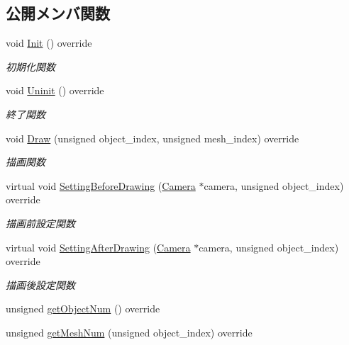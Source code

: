 \subsection*{公開メンバ関数}
\begin{DoxyCompactItemize}
\item 
void \mbox{\hyperlink{class_stencil_shadow_test_draw_a65be72e71cd12cacf315b0364c12c3e3}{Init}} () override
\begin{DoxyCompactList}\small\item\em 初期化関数 \end{DoxyCompactList}\item 
void \mbox{\hyperlink{class_stencil_shadow_test_draw_ad0672bf4ecfc8091cf54ed6f2c76b618}{Uninit}} () override
\begin{DoxyCompactList}\small\item\em 終了関数 \end{DoxyCompactList}\item 
void \mbox{\hyperlink{class_stencil_shadow_test_draw_abb5f9445b7d94c213a3751fa57e36643}{Draw}} (unsigned object\+\_\+index, unsigned mesh\+\_\+index) override
\begin{DoxyCompactList}\small\item\em 描画関数 \end{DoxyCompactList}\item 
virtual void \mbox{\hyperlink{class_stencil_shadow_test_draw_a0f697b6dad67048c7f8916a53cca6b1c}{Setting\+Before\+Drawing}} (\mbox{\hyperlink{class_camera}{Camera}} $\ast$camera, unsigned object\+\_\+index) override
\begin{DoxyCompactList}\small\item\em 描画前設定関数 \end{DoxyCompactList}\item 
virtual void \mbox{\hyperlink{class_stencil_shadow_test_draw_a68917115d3f151ed91ce297924ee5bbb}{Setting\+After\+Drawing}} (\mbox{\hyperlink{class_camera}{Camera}} $\ast$camera, unsigned object\+\_\+index) override
\begin{DoxyCompactList}\small\item\em 描画後設定関数 \end{DoxyCompactList}\item 
unsigned \mbox{\hyperlink{class_stencil_shadow_test_draw_ad93f1c8a60a701d185108896c58dd578}{get\+Object\+Num}} () override
\item 
unsigned \mbox{\hyperlink{class_stencil_shadow_test_draw_a285b3045ff5cc34b6b2b991cca434bb3}{get\+Mesh\+Num}} (unsigned object\+\_\+index) override

\end{DoxyCompactItemize}
